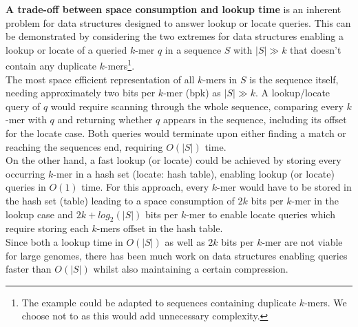 \documentclass[a4paper,titlepage,onecolumn,oneside,12pt,nenglish,titlepage=firstiscover]{scrbook}
\theoremstyle{plain} %
\theoremstyle{definition} %
\theoremstyle{remark} %
\theoremstyle{plain}
\begin{document}
\textbf{A trade-off between space consumption and lookup time} is an inherent problem for data structures designed to answer lookup or locate queries. This can be demonstrated by considering the two extremes for data structures enabling a lookup or locate of a queried $k$-mer $q$ in a sequence $S$ with $|S| \gg k$ that doesn't contain any duplicate $k$-mers\footnote{The example could be adapted to sequences containing duplicate $k$-mers. We choose not to as this would add unnecessary complexity.}.\\
The most space efficient representation of all $k$-mers in $S$ is the sequence itself, needing approximately two bits per $k$-mer (bpk) as $|S| \gg k$. A lookup/locate query of $q$ would require scanning through the whole sequence, comparing every $k$-mer with $q$ and returning whether $q$ appears in the sequence, including its offset for the locate case. Both queries would terminate upon either finding a match or reaching the sequences end, requiring $O(|S|)$ time.\\
On the other hand, a fast lookup (or locate) could be achieved by storing every occurring $k$-mer in a hash set (locate: hash table), enabling lookup (or locate)  queries in $O(1)$ time. For this approach, every $k$-mer would have to be stored in the hash set (table) leading to a space consumption of $2k$ bits per $k$-mer in the lookup case and  $2k+log_2(|S|)$ bits per $k$-mer to enable locate queries which require storing each $k$-mers offset in the hash table.\\
Since both a lookup time in $O(|S|)$ as well as $2k$ bits per $k$-mer are not viable for large genomes, there has been much work on data structures enabling queries faster than $O(|S|)$ whilst also maintaining a certain compression.\\
\end{document}
